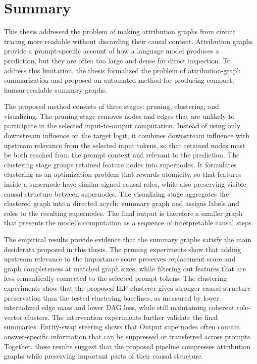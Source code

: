 \documentclass[../main.tex]{subfiles}
\begin{document}
\section{Summary}

This thesis addressed the problem of making attribution graphs from circuit tracing
more readable without discarding their causal content. Attribution graphs provide a
prompt-specific account of how a language model produces a prediction, but they
are often too large and dense for direct inspection. To address this limitation, the
thesis formalized the problem of attribution-graph summarization and proposed an
automated method for producing compact, human-readable summary graphs.

The proposed method consists of three stages: pruning, clustering, and visualizing.
The pruning stage removes nodes and edges that are unlikely to participate in the
selected input-to-output computation. Instead of using only downstream influence
on the target logit, it combines downstream influence with upstream relevance from
the selected input tokens, so that retained nodes must be both reached from the
prompt context and relevant to the prediction. The clustering stage groups retained
feature nodes into supernodes. It formulates clustering as an optimization problem
that rewards atomicity, so that features inside a supernode have similar signed
causal roles, while also preserving visible causal structure between supernodes. The
visualizing stage aggregates the clustered graph into a directed acyclic summary
graph and assigns labels and roles to the resulting supernodes. The final output is
therefore a smaller graph that presents the model's computation as a sequence of
interpretable causal steps.

The empirical results provide evidence that the summary graphs satisfy the main
desiderata proposed in this thesis. The pruning experiments show that adding
upstream relevance to the importance score preserves replacement score and graph
completeness at matched graph sizes, while filtering out features that are less
semantically connected to the selected prompt tokens. The clustering experiments
show that the proposed ILP clusterer gives stronger causal-structure preservation
than the tested clustering baselines, as measured by lower internalized edge mass
and lower DAG loss, while still maintaining coherent role-vector clusters. The
intervention experiments further validate the final summaries. Entity-swap steering
shows that Output supernodes often contain answer-specific information that can be
suppressed or transferred across prompts. Together, these results suggest that the proposed
pipeline compresses attribution graphs while preserving important parts of their
causal structure.
\end{document}
